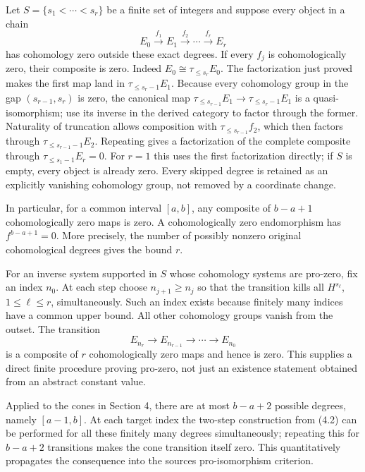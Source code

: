 \documentclass[11pt]{article}
\begin{document}
Let \(S=\{s_1<\cdots<s_r\}\) be a finite set of integers and suppose every object in a chain \[
E_0\xrightarrow{f_1}E_1\xrightarrow{f_2}\cdots
 \xrightarrow{f_r}E_r
\] has cohomology zero outside these exact degrees. If every \(f_j\) is cohomologically zero,\allowbreak{} their composite is zero. Indeed \(E_0\cong\tau_{\leq s_r}E_0\). The factorization just proved makes the first map land in \(\tau_{\leq s_r-1}E_1\). Because every cohomology group in the gap \((s_{r-1},s_r)\) is zero,\allowbreak{} the canonical map \(\tau_{\leq s_{r-1}}E_1\to\tau_{\leq s_r-1}E_1\) is a quasi-isomorphism; use its inverse in the derived category to factor through the former. Naturality of truncation allows composition with \(\tau_{\leq s_{r-1}}f_2\),\allowbreak{} which then factors through \(\tau_{\leq s_{r-1}-1}E_2\). Repeating gives a factorization of the complete composite through \(\tau_{\leq s_1-1}E_r=0\). For \(r=1\) this uses the first factorization directly; if \(S\) is empty,\allowbreak{} every object is already zero. Every skipped degree is retained as an explicitly vanishing cohomology group,\allowbreak{} not removed by a coordinate change.

In particular,\allowbreak{} for a common interval \([a,b]\),\allowbreak{} any composite of \(b-a+1\) cohomologically zero maps is zero. A cohomologically zero endomorphism has \(f^{b-a+1}=0\). More precisely,\allowbreak{} the number of possibly nonzero original cohomological degrees gives the bound \(r\).

For an inverse system supported in \(S\) whose cohomology systems are pro-zero,\allowbreak{} fix an index \(n_0\). At each step choose \(n_{j+1}\geq n_j\) so that the transition kills all \(H^{s_\ell}\),\allowbreak{} \(1\leq\ell\leq r\),\allowbreak{} simultaneously. Such an index exists because finitely many indices have a common upper bound. All other cohomology groups vanish from the outset. The transition \[
E_{n_r}\longrightarrow E_{n_{r-1}}\longrightarrow\cdots
 \longrightarrow E_{n_0}
\] is a composite of \(r\) cohomologically zero maps and hence is zero. This supplies a direct finite procedure proving pro-zero,\allowbreak{} not just an existence statement obtained from an abstract constant value.

Applied to the cones in Section 4,\allowbreak{} there are at most \(b-a+2\) possible degrees,\allowbreak{} namely \([a-1,b]\). At each target index the two-step construction from (4.2)\allowbreak{} can be performed for all these finitely many degrees simultaneously; repeating this for \(b-a+2\) transitions makes the cone transition itself zero. This quantitatively propagates the consequence into the source\textquotesingle s pro-isomorphism criterion.
\end{document}
